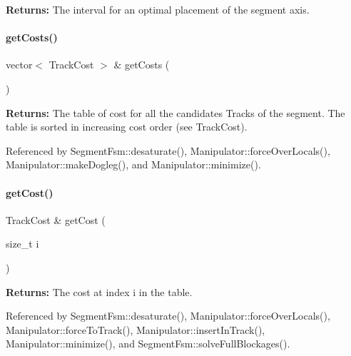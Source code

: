 {\bfseries Returns\+:} The interval for an optimal placement of the segment axis. \mbox{\label{classKite_1_1SegmentFsm_ab7144079976c8808e69f9aac68dda06d}} 
\paragraph{\texorpdfstring{get\+Costs()}{getCosts()}}
{\footnotesize\ttfamily vector$<$ Track\+Cost $>$ \& get\+Costs (\begin{DoxyParamCaption}{ }\end{DoxyParamCaption})\hspace{0.3cm}{\ttfamily [inline]}}

{\bfseries Returns\+:} The table of cost for all the candidates Tracks of the segment. The table is sorted in increasing cost order (see Track\+Cost). 

Referenced by Segment\+Fsm\+::desaturate(), Manipulator\+::force\+Over\+Locals(), Manipulator\+::make\+Dogleg(), and Manipulator\+::minimize().

\mbox{\label{classKite_1_1SegmentFsm_a5256595f77ebc80c3ee683cfdbc7f8f6}} 
\paragraph{\texorpdfstring{get\+Cost()}{getCost()}}
{\footnotesize\ttfamily Track\+Cost \& get\+Cost (\begin{DoxyParamCaption}\item[{size\+\_\+t}]{i }\end{DoxyParamCaption})\hspace{0.3cm}{\ttfamily [inline]}}

{\bfseries Returns\+:} The cost at index {\ttfamily i} in the table. 

Referenced by Segment\+Fsm\+::desaturate(), Manipulator\+::force\+Over\+Locals(), Manipulator\+::force\+To\+Track(), Manipulator\+::insert\+In\+Track(), Manipulator\+::minimize(), and Segment\+Fsm\+::solve\+Full\+Blockages().

\mbox{\label{classKite_1_1SegmentFsm_af2d9a3a5df8a4de5d263fb3fae563a8a}} 
